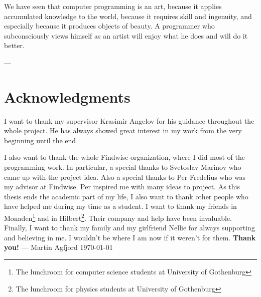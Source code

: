 
\vspace{30mm}
\begin{flushleft}{\slshape

We have seen that computer programming is an art, because it applies accumulated knowledge to the world, because it requires skill and ingenuity, and especially
    because it produces objects of beauty. A programmer who
    subconsciously views himself as an artist will enjoy what he does and will do it better.} \medskip
\end{flushleft}
\begin{flushright}
---  \citep{knuth:1974}
\end{flushright}



\bigskip

\begingroup
\let\clearpage\relax
\let\cleardoublepage\relax
\let\cleardoublepage\relax
\chapter*{Acknowledgments}
I want to thank my supervisor Krasimir Angelov for his guidance throughout the whole project. He has always showed great interest in my work from the very beginning until the end. 

I also want to thank the whole Findwise organization, where I did most of the programming work. In particular, a special thanks to Svetoslav Marinov who came up with the project idea. Also a special thanks to Per Fredelius who was my advisor at Findwise. Per inspired me with many ideas to project. 
\newline
\newline
As this thesis ends the academic part of my life, I also want to thank other people who have helped me during my time as a student.
\newline
\newline
I want to thank my friends in Monaden\footnote{The lunchroom for computer science students at University of Gothenburg} and in Hilbert\footnote{The lunchroom for physics students at University of Gothenburg}. Their company and help have been invaluable.
\newline
\newline
Finally, I want to thank my family and my girlfriend Nellie for always supporting and believing in me. I wouldn't be where I am now if it weren't for them.
\newline
\newline
\newline
\newline
\textbf{Thank you!}
\newline
\newline
---
\newline
Martin Agfjord
\newline
\today
\endgroup



